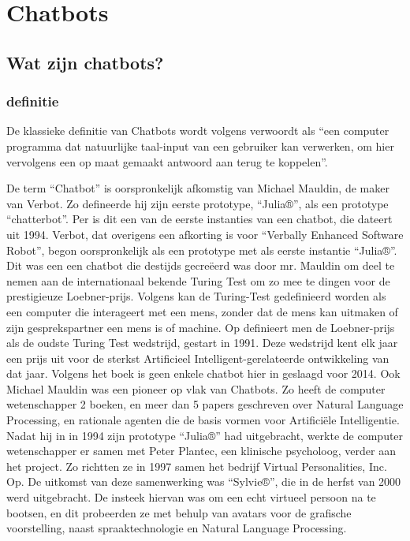 \section{Chatbots}
\subsection{Wat zijn chatbots?}
\subsubsection{definitie}
De klassieke definitie van Chatbots wordt volgens \textcite{Khan2017} verwoordt als “een computer programma dat natuurlijke taal-input van een gebruiker kan verwerken, om hier vervolgens een op maat gemaakt antwoord aan terug te koppelen”. 

De term “Chatbot” is oorspronkelijk afkomstig van Michael Mauldin, de maker van Verbot. Zo defineerde hij zijn eerste prototype, “Julia®”, als een prototype “chatterbot”. Per \textcite{Vlahos2019} is dit een van de eerste instanties van een chatbot, die dateert uit 1994. Verbot, dat overigens een afkorting is voor “Verbally Enhanced Software Robot”, begon oorspronkelijk als een prototype met als eerste instantie “Julia®”. Dit was een een chatbot die destijds gecreëerd was door mr. Mauldin om deel te nemen aan de internationaal bekende Turing Test om zo mee te dingen voor de prestigieuze Loebner-prijs. Volgens \textcite{Moor2012} kan de Turing-Test gedefinieerd worden als een computer die interageert met een mens, zonder dat de mens kan uitmaken of zijn gesprekspartner een mens is of machine. Op \textcite{O'Neill2016} definieert men de Loebner-prijs als de oudste Turing Test wedstrijd, gestart in 1991. Deze wedstrijd kent elk jaar een prijs uit voor de sterkst Artificieel Intelligent-gerelateerde ontwikkeling van dat jaar. Volgens het boek is geen enkele chatbot hier in geslaagd voor 2014. 
Ook Michael Mauldin was een pioneer op vlak van Chatbots. Zo heeft de computer wetenschapper 2 boeken, en meer dan 5 papers geschreven over Natural Language Processing, en rationale agenten die de basis vormen voor Artificiële Intelligentie. Nadat hij in in 1994 zijn prototype “Julia®” had uitgebracht, werkte de computer wetenschapper er samen met Peter Plantec, een klinische psycholoog, verder aan het project. Zo richtten ze in 1997 samen het bedrijf Virtual Personalities, Inc. Op. De uitkomst van deze samenwerking was “Sylvie®”, die in de herfst van 2000 werd uitgebracht. De insteek hiervan was om een echt virtueel persoon na te bootsen, en dit probeerden ze met behulp van avatars voor de grafische voorstelling, naast spraaktechnologie en Natural Language Processing. 

